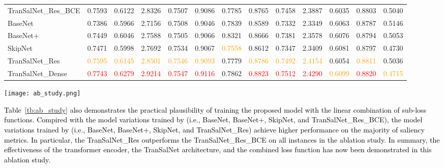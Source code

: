 \documentclass{article}
\begin{document}
\begin{table*}[]
{\begin{tabular}{l|cccccc|cccccc}
TranSalNet\_Res\_BCE  &0.7593& 0.6122& \multicolumn{1}{c|}{ 2.8326} &0.7507&0.9086& 0.7785&0.8765& 0.7458& \multicolumn{1}{c|}{2.3887} &0.6035& 0.8803& 0.5040 \\

BaseNet &0.7386  &0.5966 & \multicolumn{1}{c|}{2.7156 } &0.7508 &0.9046 &0.7839 &0.8589 &0.7332 & \multicolumn{1}{c|}{2.3349 } &0.6063 &0.8787 &0.5146 \\

BaseNet+ &0.7449&0.6046& \multicolumn{1}{c|}{2.7588 } &0.7505 & 0.9066 & 0.8321 & 0.8666 &0.7381 & \multicolumn{1}{c|}{2.3578 } &0.6076 &0.8794 &0.5053  \\

SkipNet &0.7471 & 0.5998 & \multicolumn{1}{c|}{2.7692 } &0.7534 & 0.9067 & \textcolor{orange}{0.7558} & 
0.8612  &0.7347 & \multicolumn{1}{c|}{2.3409} &0.6081 &0.8797 & 0.4730 \\

TranSalNet\_Res &\textcolor{orange}{0.7595}&\textcolor{orange}{0.6145}& \multicolumn{1}{c|}{\textcolor{orange}{2.8501}} &\textcolor{orange}{0.7546}&\textcolor{orange}{0.9093}& 0.7779& \textcolor{orange}{0.8786}& \textcolor{orange}{0.7492}& \multicolumn{1}{c|}{\textcolor{orange}{2.4154}} &0.6054&\textcolor{orange}{0.8811}& 0.5036\\ 

TranSalNet\_Dense &\textcolor{red}{0.7743}&\textcolor{red}{0.6279}& \multicolumn{1}{c|}{\textcolor{red}{2.9214}} &\textcolor{red}{0.7547}&\textcolor{red}{0.9116}& 0.7862& \textcolor{red}{0.8823}& \textcolor{red}{0.7512}& \multicolumn{1}{c|}{\textcolor{red}{2.4290}} &\textcolor{orange}{0.6099}&\textcolor{red}{0.8820}& \textcolor{orange}{0.4715}\\
\bottomrule
\end{tabular}\label{tb:ab_study}
}
\end{table*}


\begin{figure*}
\centering
\texttt{[image: ab\_study.png]}
\caption{Comparison of the saliency prediction performance of nine model variants in our ablation study. The images of top two rows are from the MIT1003 dataset and the bottom two rows are from the CAT2000 dataset. It can be seen that by adopting transformer encoder, skip-connection to provide multi-scale information, and combined loss function, the generated saliency maps are significantly refined relative to the ground truth.}
\label{fig:ab_study}
\end{figure*}
\textcolor{black}{Table~\ref{tb:ab_study} also  demonstrates the practical plausibility of training the proposed model with the linear combination of sub-loss functions.
Compired with the model variations trained by  (i.e., BaseNet, BaseNet+, SkipNet, and TranSalNet\_Res\_BCE), the model variations trained by  (i.e., BaseNet, BaseNet+, SkipNet, and TranSalNet\_Res) achieve higher performance on the majority of saliency metrics.
In particular, the TranSalNet\_Res outperforms the TranSalNet\_Res\_BCE on all instances in the ablation study. In summary, the effectiveness of the transformer encoder, the TranSalNet architecture, and the combined loss function has now been demonstrated in this ablation study. 
}
\end{document}
